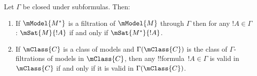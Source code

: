 \documentclass[../../../include/open-logic-section]{subfiles}
\begin{document}
\begin{cor}
  Let $\Gamma$ be closed under subformulas. Then:
  \begin{enumerate}
  \item If $\mModel{M^*}$ is a filtration of $\mModel{M}$ through
    $\Gamma$ then for any $!A \in \Gamma$: $\mSat{M}{!A}$ if and only
    if $\mSat{M^*}{!A}$.
  \item If $\mClass{C}$ is a class of models and $\Gamma(\mClass{C})$
    is the class of $\Gamma$-filtrations of models in $\mClass{C}$,
    then any !!{formula}~$!A \in \Gamma$ is valid in $\mClass{C}$ if
    and only if it is valid in $\Gamma(\mClass{C})$.
  \end{enumerate}
\end{cor}
\end{document}
